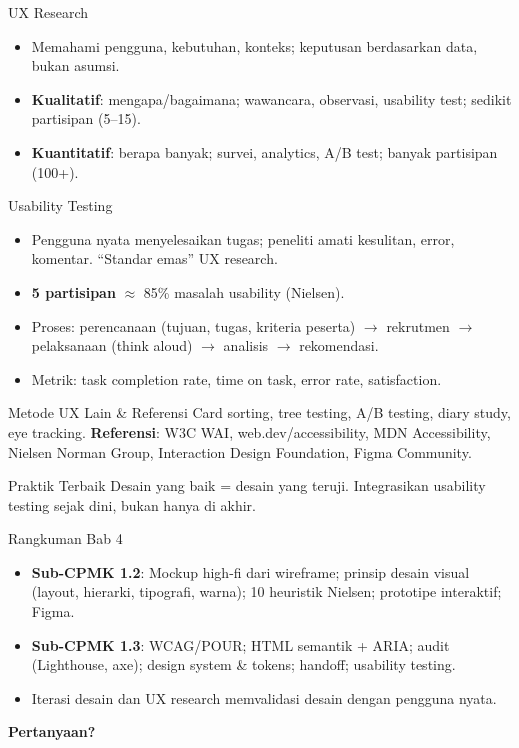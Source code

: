 \documentclass[handout]{beamer}
\begin{document}
\begin{frame}{UX Research}
	\begin{itemize}
		\item Memahami pengguna, kebutuhan, konteks; keputusan berdasarkan data, bukan asumsi.
		\item \textbf{Kualitatif}: mengapa/bagaimana; wawancara, observasi, usability test; sedikit partisipan (5--15).
		\item \textbf{Kuantitatif}: berapa banyak; survei, analytics, A/B test; banyak partisipan (100+).
	\end{itemize}
\end{frame}

\begin{frame}{Usability Testing}
	\begin{itemize}
		\item Pengguna nyata menyelesaikan tugas; peneliti amati kesulitan, error, komentar. ``Standar emas'' UX research.
		\item \textbf{5 partisipan} $\approx$ 85\% masalah usability (Nielsen).
		\item Proses: perencanaan (tujuan, tugas, kriteria peserta) $\to$ rekrutmen $\to$ pelaksanaan (think aloud) $\to$ analisis $\to$ rekomendasi.
		\item Metrik: task completion rate, time on task, error rate, satisfaction.
	\end{itemize}
\end{frame}

\begin{frame}{Metode UX Lain \& Referensi}
	Card sorting, tree testing, A/B testing, diary study, eye tracking.
	\vspace{0.5em}
	\textbf{Referensi}: W3C WAI, web.dev/accessibility, MDN Accessibility, Nielsen Norman Group, Interaction Design Foundation, Figma Community.
	\begin{block}{Praktik Terbaik}
		Desain yang baik = desain yang teruji. Integrasikan usability testing sejak dini, bukan hanya di akhir.
	\end{block}
\end{frame}

\begin{frame}{Rangkuman Bab 4}
	\begin{itemize}
		\item \textbf{Sub-CPMK 1.2}: Mockup high-fi dari wireframe; prinsip desain visual (layout, hierarki, tipografi, warna); 10 heuristik Nielsen; prototipe interaktif; Figma.
		\item \textbf{Sub-CPMK 1.3}: WCAG/POUR; HTML semantik + ARIA; audit (Lighthouse, axe); design system \& tokens; handoff; usability testing.
		\item Iterasi desain dan UX research memvalidasi desain dengan pengguna nyata.
	\end{itemize}
\end{frame}

\begin{frame}{}
	\centering
	\vfill
	\textbf{\Large Pertanyaan?}
	\vfill
\end{frame}
\end{document}
